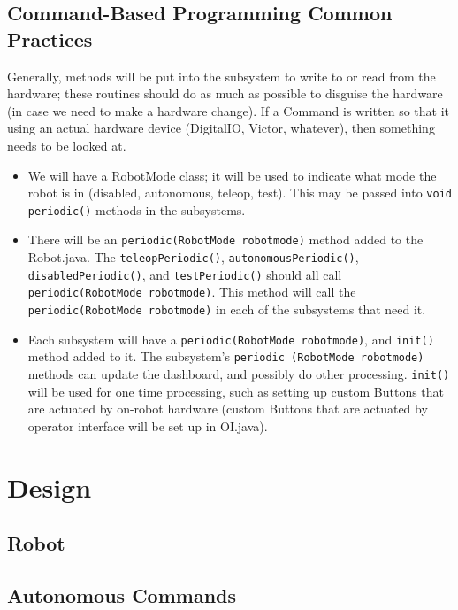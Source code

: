 \documentclass[]{article}
\begin{document}
\subsection {Command-Based Programming Common Practices}
Generally, methods will be put into the subsystem to write to or read from the hardware; these routines should do as much as possible to disguise the hardware (in case we need to make a hardware change). If a Command is written so that it using an actual hardware device (DigitalIO, Victor, whatever), then something needs to be looked at.
\begin{itemize}
\item We will have a RobotMode class; it will be used to indicate what mode the robot is in (disabled, autonomous, teleop, test). This may be passed into \lstinline[]|void periodic()| methods in the subsystems.
\item There will be an \lstinline[]|periodic(RobotMode robotmode)| method added to the Robot.java. The  \lstinline[]|teleopPeriodic()|,  \lstinline[]|autonomousPeriodic()|,  \lstinline[]|disabledPeriodic()|, and  \lstinline[]|testPeriodic()|
should all call  \lstinline[]|periodic(RobotMode robotmode)|. This method will call the \lstinline[]|periodic(RobotMode robotmode)| in each of the subsystems that need it.
\item Each subsystem will have a \lstinline[]|periodic(RobotMode robotmode)|, and \lstinline[]|init()| method added to it. The subsystem's \lstinline[]|periodic (RobotMode robotmode)| methods can update the dashboard, and possibly do other processing. \lstinline[]|init()| will be used for one time processing, such as setting up custom Buttons that are actuated by on-robot hardware (custom Buttons that are actuated by operator interface will be set up in OI.java).
\end{itemize}

\newpage

\section{Design}

\subsection{Robot}

\subsection{Autonomous Commands}
\end{document}
